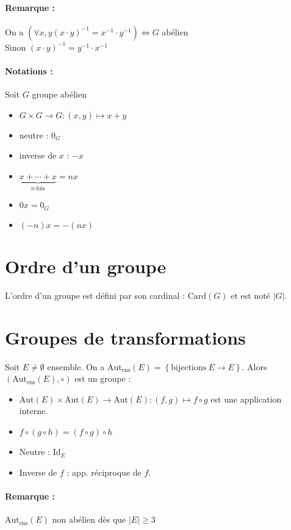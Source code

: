 \documentclass[a4paper,10pt]{report}
\newcommand{\set}[1]{\left\lbrace #1 \right\rbrace } %
\newcommand{\underb}[2]{\underset{ #1 }{\underbrace{ #2 }}}
\newcommand{\id}{\mathrm{Id}} %
\newcommand{\Autens}[1]{\text{Aut}_{\text{ens}}\left(#1\right)}
\begin{document}
   \paragraph{Remarque : } On a $(\forall x,y (x \cdot y)^{-1} = x^{-1} \cdot
   y^{-1}) \iff G$ abélien\\
   Sinon $(x \cdot y)^{-1}=y^{-1} \cdot x^{-1}$

   \paragraph{Notations : } Soit $G$ groupe abélien
   \begin{itemize}
     \item $G \times G \to G  : (x,y) \mapsto x+y$
     \item neutre : $0_G$
     \item inverse de $x$ : $-x$
     \item $\underb{n \  \mathrm{fois}}{x + \cdots + x} = nx$
     \item $0x = 0_G$
     \item $(-n)x=-(nx)$
   \end{itemize}

  \section{Ordre d'un groupe}
   L'ordre d'un groupe est défini par son cardinal : $\mathrm{Card}(G)$ et est
   noté $|G|$.  

  \section{Groupes de transformations}
   Soit $E \ne \emptyset$ ensemble.
   On a $\Autens{E}=\set{\mathrm{bijections}\  E \to E}$.
   Alors $(\Autens{E}, \circ)$ est un groupe :
   \begin{itemize}
     \item $\mathrm{Aut}(E) \times \mathrm{Aut}(E) \to 
       \mathrm{Aut}(E) : (f,g) \mapsto f \circ g$ est une application interne.
     \item $f \circ (g \circ h) = (f \circ g) \circ h$
     \item Neutre : $\id_E$
     \item Inverse de $f$ : app. réciproque de $f$.
   \end{itemize} 
   \paragraph{Remarque : } $\Autens{E}$ non abélien dès que $|E| \ge 3$
\end{document}
